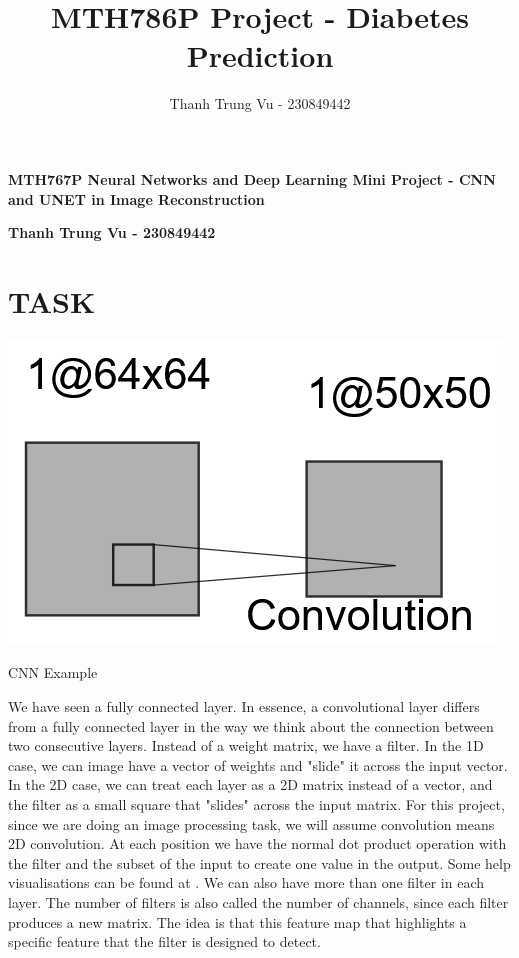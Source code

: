 \documentclass[12pt]{article}
\title{MTH786P Project - Diabetes Prediction}
\author{Thanh Trung Vu - 230849442}
\makeatletter
\renewcommand{\maketitle}{
    {\LARGE \@title \par}      %
    {\large \@author \par}     %
}
\makeatother
\begin{document}
\setlength\parskip{0.5em plus 0.1em minus 0.2em}






{\large \textbf{MTH767P Neural Networks and Deep Learning Mini Project - CNN and UNET in Image Reconstruction}}

{\large \textbf{Thanh Trung Vu - 230849442}}


\section{TASK}

\begin{center}
    \includegraphics[width=0.3\linewidth]{cnn_example_1.png}
    
    \caption{CNN Example}
    \label{fig:cnn_example_1}
\end{center}

We have seen a fully connected layer. In essence, a convolutional layer differs from a fully connected layer in the way we think about the connection between two consecutive layers. Instead of a weight matrix, we have a filter. In the 1D case, we can image have a vector of weights and "slide" it across the input vector. In the 2D case, we can treat each layer as a 2D matrix instead of a vector, and the filter as a small square that "slides" across the input matrix. For this project, since we are doing an image processing task, we will assume convolution means 2D convolution. At each position we have the normal dot product operation with the filter and the subset of the input to create one value in the output. Some help visualisations can be found at \cite{cnn_vis}.
We can also have more than one filter in each layer. The number of filters is also called the number of channels, since each filter produces a new matrix.
The idea is that this feature map that highlights a specific feature that the filter is designed to detect.
\end{document}
